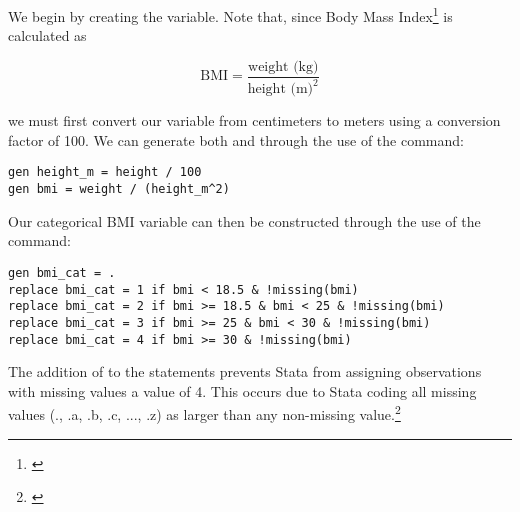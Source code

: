 

We begin by creating the  variable. Note that, since Body Mass Index\footnote{\cite{who_2000}} is calculated as

\vspace{-1em}

\begin{equation}
  \text{BMI} = \frac{\text{weight (kg)}}{\text{height (m)}^2}
\end{equation}

we must first convert our  variable from centimeters to meters using a conversion factor of 100. We can generate both  and  through the use of the  command:

\begin{verbatim}
gen height_m = height / 100
gen bmi = weight / (height_m^2)
\end{verbatim}

Our categorical BMI variable  can then be constructed through the use of the  command:

\begin{verbatim}
gen bmi_cat = .
replace bmi_cat = 1 if bmi < 18.5 & !missing(bmi)
replace bmi_cat = 2 if bmi >= 18.5 & bmi < 25 & !missing(bmi)
replace bmi_cat = 3 if bmi >= 25 & bmi < 30 & !missing(bmi)
replace bmi_cat = 4 if bmi >= 30 & !missing(bmi)    
\end{verbatim}

The addition of  to the  statements prevents Stata from assigning observations with missing  values a  value of 4. This occurs due to Stata coding all missing values (., .a, .b, .c, ..., .z) as larger than any non-missing value.\footnote{\cite{gould_stata}}


